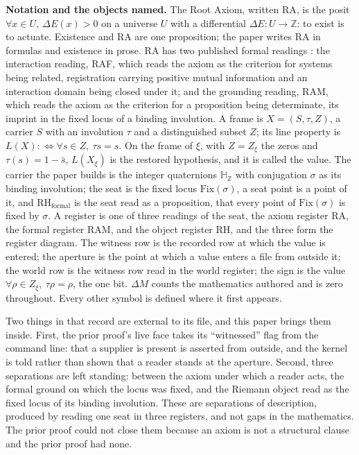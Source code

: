 \documentclass[10pt]{article}
\begin{document}
\textbf{Notation and the objects named.} The Root Axiom, written
\(\mathrm{RA}\), is the posit \(\forall x \in U,\ \Delta E(x) > 0\) on a
universe \(U\) with a differential \(\Delta E : U \to \mathbb{Z}\): to
exist is to actuate. Existence and \(\mathrm{RA}\) are one proposition;
the paper writes \(\mathrm{RA}\) in formulas and existence in prose.
\(\mathrm{RA}\) has two published formal readings \cite{islamraf}: the
interaction reading, RAF, which reads the axiom as the criterion for
systems being related, registration carrying positive mutual information
and an interaction domain being closed under it; and the grounding
reading, RAM, which reads the axiom as the criterion for a proposition
being determinate, its imprint in the fixed locus of a binding
involution. A frame is \(X = (S, \tau, Z)\), a carrier \(S\) with an
involution \(\tau\) and a distinguished subset \(Z\); its line property
is \(L(X) :\Leftrightarrow \forall s \in Z,\ \tau s = s\). On the frame
of \(\xi\), with \(Z = Z_\xi\) the zeros and \(\tau(s) = 1 - \bar{s}\),
\(L(X_\xi)\) is the restored hypothesis, and it is called the value. The
carrier the paper builds is the integer quaternions
\(\mathbb{H}_{\mathbb{Z}}\) with conjugation \(\sigma\) as its binding
involution; the seat is the fixed locus \(\mathrm{Fix}(\sigma)\), a seat
point is a point of it, and \(\mathrm{RH}_{\mathrm{formal}}\) is the
seat read as a proposition, that every point of \(\mathrm{Fix}(\sigma)\)
is fixed by \(\sigma\). A register is one of three readings of the seat,
the axiom register \(\mathrm{RA}\), the formal register
\(\mathrm{RAM}\), and the object register \(\mathrm{RH}\), and the three
form the register diagram. The witness row is the recorded row at which
the value is entered; the aperture is the point at which a value enters
a file from outside it; the world row is the witness row read in the
world register; the sign is the value
\(\forall \rho \in Z_\xi,\ \tau\rho = \rho\), the one bit. \(\Delta M\)
counts the mathematics authored and is zero throughout. Every other
symbol is defined where it first appears.

Two things in that record are external to its file, and this paper
brings them inside. First, the prior proof's live face takes its
``witnessed'' flag from the command line: that a supplier is present is
asserted from outside, and the kernel is told rather than shown that a
reader stands at the aperture. Second, three separations are left
standing: between the axiom under which a reader acts, the formal ground
on which the locus was fixed, and the Riemann object read as the fixed
locus of its binding involution. These are separations of description,
produced by reading one seat in three registers, and not gaps in the
mathematics. The prior proof could not close them because an axiom is
not a structural clause and the prior proof had none.
\end{document}
